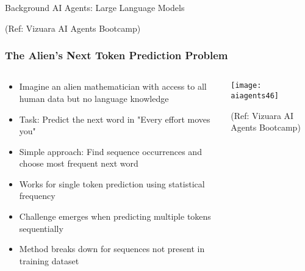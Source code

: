 \begin{frame}[fragile]\frametitle{}
\begin{center}
{\Large Background AI Agents: Large Language Models}

{\tiny (Ref: Vizuara AI Agents Bootcamp)}
\end{center}
\end{frame}

\begin{frame}[fragile]\frametitle{The Alien's Next Token Prediction Problem}

\begin{columns}
    \begin{column}[T]{0.6\linewidth}
      \begin{itemize}
	  \item Imagine an alien mathematician with access to all human data but no language knowledge
	  \item Task: Predict the next word in "Every effort moves you"
	  \item Simple approach: Find sequence occurrences and choose most frequent next word
	  \item Works for single token prediction using statistical frequency
	  \item Challenge emerges when predicting multiple tokens sequentially
	  \item Method breaks down for sequences not present in training dataset
	  \end{itemize}

    \end{column}
    \begin{column}[T]{0.4\linewidth}
		\begin{center}
		\texttt{[image: aiagents46]}

		{\tiny (Ref: Vizuara AI Agents Bootcamp)}

		\end{center}	
    \end{column}
  \end{columns}
  
\end{frame}

